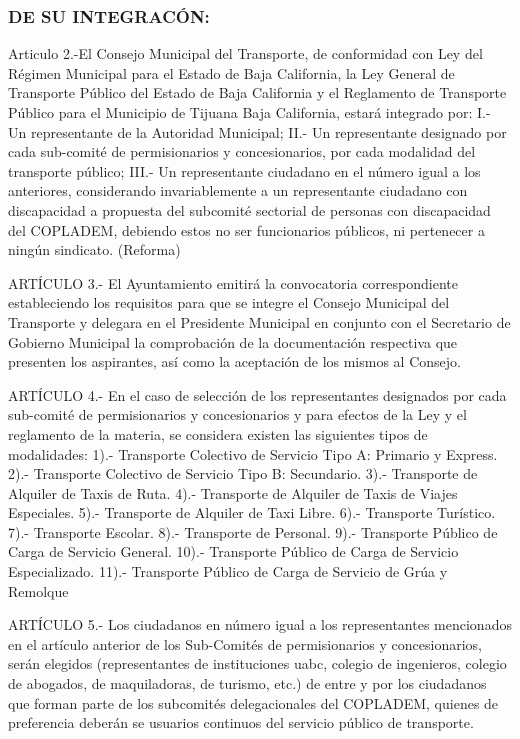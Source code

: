\documentclass{bmcart}
\begin{document}
\subsubsection{DE SU INTEGRACÓN:}

Articulo 2.-El Consejo Municipal del Transporte, de conformidad con Ley del Régimen Municipal para el Estado de Baja California, la Ley General de  Transporte Público del Estado de Baja California y el Reglamento de Transporte Público para el Municipio de Tijuana Baja California, estará integrado por:
I.- Un representante de la Autoridad Municipal;
II.- Un representante designado por cada sub-comité de permisionarios y concesionarios, por cada modalidad del transporte público;
III.- Un representante ciudadano en el número igual a los anteriores, considerando invariablemente a un representante ciudadano con discapacidad a propuesta del subcomité sectorial de personas con discapacidad del COPLADEM, debiendo estos no ser funcionarios públicos, ni pertenecer a ningún sindicato. (Reforma)

ARTÍCULO 3.- El Ayuntamiento emitirá la convocatoria correspondiente estableciendo los requisitos para que se integre el Consejo Municipal del Transporte y delegara en el Presidente Municipal en conjunto con el Secretario de Gobierno Municipal la comprobación de la documentación respectiva que presenten los aspirantes, así como la aceptación de los mismos al Consejo.

ARTÍCULO 4.- En el caso de selección de los representantes designados por  cada sub-comité de permisionarios y concesionarios y para efectos de la Ley y el reglamento de la materia, se considera existen las siguientes tipos de modalidades:
1).- Transporte Colectivo de Servicio Tipo A: Primario y Express. 2).- Transporte Colectivo de Servicio Tipo B: Secundario.
3).- Transporte de Alquiler de Taxis de Ruta.
4).- Transporte de Alquiler de Taxis de Viajes Especiales. 5).- Transporte de Alquiler de Taxi Libre.
6).- Transporte Turístico.
7).- Transporte Escolar.
8).- Transporte de Personal.
9).- Transporte Público de Carga de Servicio General.
10).- Transporte Público de Carga de Servicio Especializado.
11).- Transporte Público de Carga de Servicio de Grúa y Remolque

ARTÍCULO 5.- Los ciudadanos en número igual a los  representantes mencionados en el artículo anterior de los Sub-Comités de permisionarios y concesionarios, serán elegidos (representantes de instituciones uabc, colegio de ingenieros, colegio de abogados, de maquiladoras, de turismo, etc.) de entre y por los ciudadanos que forman parte de los subcomités delegacionales del COPLADEM, quienes de preferencia deberán se usuarios continuos del servicio público de transporte.
\end{document}
